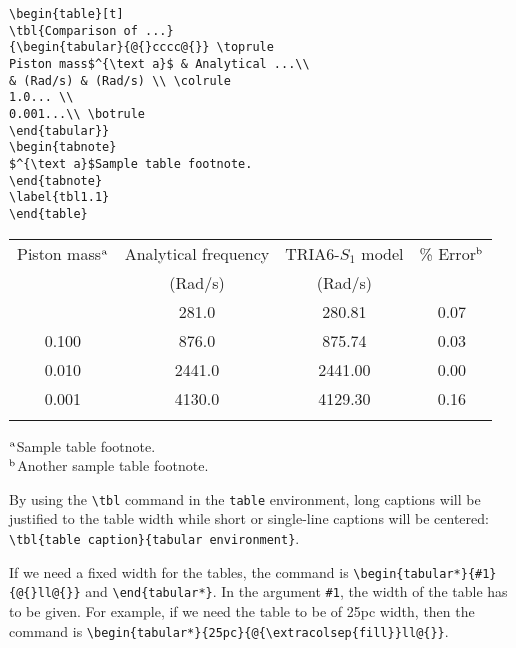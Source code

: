 \begin{verbatim}
\begin{table}[t]
\tbl{Comparison of ...}
{\begin{tabular}{@{}cccc@{}} \toprule
Piston mass$^{\text a}$ & Analytical ...\\
& (Rad/s) & (Rad/s) \\ \colrule
1.0... \\
0.001...\\ \botrule
\end{tabular}}
\begin{tabnote}
$^{\text a}$Sample table footnote.
\end{tabnote}
\label{tbl1.1}
\end{table}
\end{verbatim}

\begin{table}[t]
{\begin{tabular}{@{}cccc@{}} \toprule
Piston mass$^{\text a}$ & Analytical frequency & TRIA6-$S_1$ model & \% Error$^{\text b}$ \\
& (Rad/s) & (Rad/s) \\ \colrule
1.000 & \hphantom{0}281.0 & \hphantom{0}280.81 & 0.07 \\
0.100 & \hphantom{0}876.0 & \hphantom{0}875.74 & 0.03 \\
0.010 & 2441.0 & 2441.00 & 0.00 \\
0.001 & 4130.0 & 4129.30 & 0.16\\ \botrule
\end{tabular}
}
\begin{tabnote}
$^{\text a}$Sample table footnote.\\
$^{\text b}$Another sample table footnote.
\end{tabnote}
\label{tbl1.1}
\end{table}

By using the \verb|\tbl| command in the \verb|table| environment, long captions will
be justified to the table width while short or single-line captions
will be centered: \verb|\tbl{table caption}{tabular environment}|.

If we need a fixed width for the tables, the command is
\verb|\begin{tabular*}{#1}{@{}ll@{}}| and \verb|\end{tabular*}|.
In the argument \verb|#1|, the width of the table has to be given.
For example, if we need the table to be of 25pc width, then the command is
\verb|\begin{tabular*}{25pc}{@{\extracolsep{fill}}ll@{}}|.

